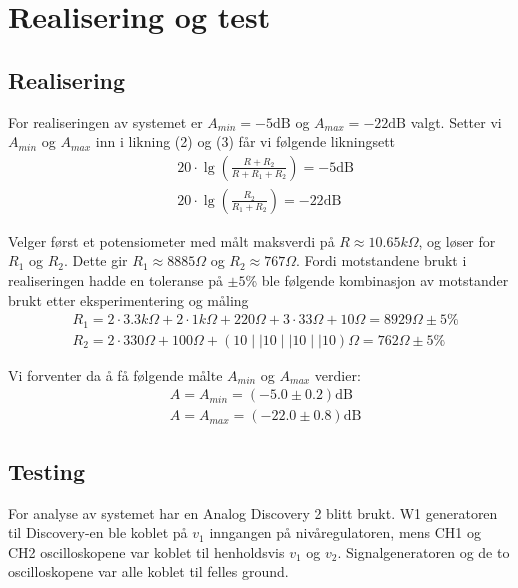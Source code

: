 \section{Realisering og test}
\label{realiseringOgTest}

\subsection{Realisering}
For realiseringen av systemet er $A_{min} = -5\text{dB}$ og $A_{max} = -22\text{dB}$ valgt.
Setter vi $A_{min}$ og $A_{max}$ inn i likning (2) og (3) får vi følgende likningsett
\begin{align}
    &20 \cdot \lg{\left(\frac{R + R_2}{R + R_1 + R_2}\right)} = -5 \text{dB} \label{eq:eq1} \tag{I} \\
    &20 \cdot \lg{\left(\frac{R_2}{R_1 + R_2}\right)} = -22 \text{dB} \label{eq:eq2} \tag{II}
\end{align}

Velger først et potensiometer med målt maksverdi på $R \approx 10.65k\Omega$, og løser for $R_1$ og $R_2$.
Dette gir $R_1 \approx 8885\Omega$ og $R_2 \approx 767\Omega$. Fordi motstandene brukt i realiseringen 
hadde en toleranse på $\pm 5$\% ble følgende kombinasjon av motstander brukt etter eksperimentering og måling
\begin{align*}
    &R_1 = 2 \cdot 3.3k\Omega + 2 \cdot 1k\Omega + 220\Omega + 3 \cdot 33\Omega + 10\Omega = 8929\Omega \pm 5\% \\
    &R_2 = 2 \cdot 330\Omega + 100\Omega + \left(10 \mid\mid 10 \mid\mid 10 \mid\mid 10\right)\Omega = 762\Omega \pm 5\%
\end{align*}

Vi forventer da å få følgende målte $A_{min}$ og $A_{max}$ verdier:
\begin{align*}
    &A = A_{min} = (-5.0 \pm 0.2) \text{dB} \\
    &A = A_{max} = (-22.0 \pm 0.8) \text{dB} 
\end{align*}

\subsection{Testing}
For analyse av systemet har en Analog Discovery 2 \cite{discovery} blitt brukt. 
W1 generatoren til Discovery-en ble koblet på $v_1$ inngangen på nivåregulatoren,
mens CH1 og CH2 oscilloskopene var koblet til henholdsvis $v_1$ og $v_2$. Signalgeneratoren og 
de to oscilloskopene var alle koblet til felles ground.

